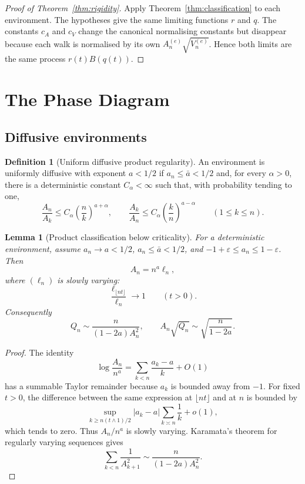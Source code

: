 \documentclass[11pt]{article}
\newtheorem{lemma}{Lemma}
\theoremstyle{definition}
\newtheorem{definition}{Definition}
\theoremstyle{remark}
\newcommand{\1}{\mathbf{1}}
\begin{document}
\begin{proof}[Proof of Theorem~\ref{thm:rigidity}]
Apply Theorem~\ref{thm:classification} to each environment. The hypotheses give
the same limiting functions \(r\) and \(q\). The constants \(c_A\) and \(c_V\)
change the canonical normalising constants but disappear because each walk is
normalised by its own \(A_n^{(e)}\sqrt{V_n^{(e)}}\). Hence both limits are the
same process \(r(t)B(q(t))\).
\end{proof}

\section{The Phase Diagram}\label{sec:regimes}

\subsection{Diffusive environments}

\begin{definition}[Uniform diffusive product regularity]\label{def:diff-reg}
An environment is uniformly diffusive with exponent \(a<1/2\) if \(a_n\le\bar
a<1/2\) and, for every \(\alpha>0\), there is a deterministic constant
\(C_\alpha<\infty\) such that, with probability tending to one,
\[
  \frac{A_n}{A_k}\le C_\alpha\left(\frac{n}{k}\right)^{a+\alpha},
  \qquad
  \frac{A_k}{A_n}\le C_\alpha\left(\frac{k}{n}\right)^{a-\alpha}
  \qquad(1\le k\le n).
\]
\end{definition}

\begin{lemma}[Product classification below criticality]\label{lem:product-conv}
For a deterministic environment, assume \(a_n\to a<1/2\), \(a_n\le\bar a<1/2\),
and \(-1+\varepsilon\le a_n\le1-\varepsilon\). Then
\[
  A_n=n^a\ell_n,
\]
where \((\ell_n)\) is slowly varying:
\[
  \frac{\ell_{\lfloor nt\rfloor}}{\ell_n}\to1
  \qquad(t>0).
\]
Consequently
\[
  Q_n\sim \frac{n}{(1-2a)A_n^2},
  \qquad
  A_n\sqrt{Q_n}\sim \sqrt{\frac{n}{1-2a}}.
\]
\end{lemma}

\begin{proof}
The identity
\[
  \log\frac{A_n}{n^a}
  =
  \sum_{k<n}\frac{a_k-a}{k}+O(1)
\]
has a summable Taylor remainder because \(a_k\) is bounded away from \(-1\).
For fixed \(t>0\), the difference between the same expression at
\(\lfloor nt\rfloor\) and at \(n\) is bounded by
\[
  \sup_{k\ge n(t\wedge1)/2}|a_k-a|
  \sum_{k\asymp n}\frac1k+o(1),
\]
which tends to zero. Thus \(A_n/n^a\) is slowly varying. Karamata's theorem for
regularly varying sequences gives
\[
  \sum_{k<n}\frac1{A_{k+1}^2}
  \sim
  \frac{n}{(1-2a)A_n^2}.
\]
\end{proof}
\end{document}
